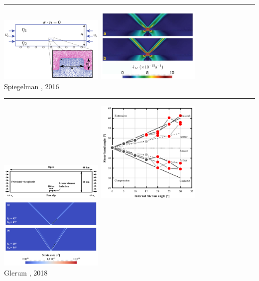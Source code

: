 \begin{center}\noindent\rule{12cm}{0.4pt}\end{center}

\begin{center}
\includegraphics[width=5cm]{images/benchmark_brick/spmw16a}
\includegraphics[width=5cm]{images/benchmark_brick/spmw16b}\\
{\captionfont Spiegelman \etal, 2016 \cite{spmw16}}
\end{center}

\begin{center}\noindent\rule{12cm}{0.4pt}\end{center}

\begin{center}
\includegraphics[width=5cm]{images/benchmark_brick/gltf18a}
\includegraphics[width=5cm]{images/benchmark_brick/gltf18b}
\includegraphics[width=5cm]{images/benchmark_brick/gltf18c}\\
{\captionfont Glerum \etal, 2018 \cite{gltf18}}
\end{center}

